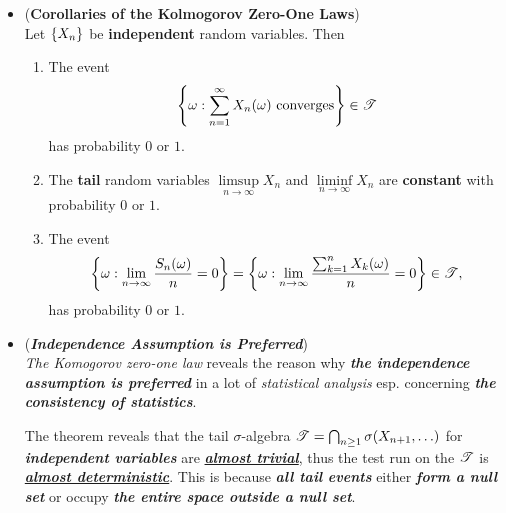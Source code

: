 \documentclass[11pt]{article}
\begin{document}
\begin{itemize}
\item \begin{corollary} (\textbf{Corollaries of the Kolmogorov Zero-One Laws}) \citep{resnick2013probability} \\
Let $\left\{X_{n}\right\}$ be \textbf{independent} random variables. Then 
\begin{enumerate}
\item The event 
\begin{align*}
\left\{\omega: \sum_{n=1}^{\infty}X_{n}(\omega) \text{ converges}\right\} \in {\mathscr T}
\end{align*} has probability $0$ or $1$.
\item The \textbf{tail} random variables $\limsup\limits_{n\rightarrow \infty} X_{n}$ and $\liminf\limits_{n\rightarrow \infty} X_{n}$ are \textbf{constant} with probability $0$ or $1$.
\item The event 
\begin{align*}
\left\{\omega: \lim\limits_{n\rightarrow \infty}\frac{S_n(\omega)}{n} = 0\right\} = \left\{\omega: \lim\limits_{n\rightarrow \infty}\frac{\sum_{k=1}^{n}X_{k}(\omega)}{n} = 0\right\} \in {\mathscr T},
\end{align*} has probability $0$ or $1$.
\end{enumerate}
\end{corollary}

\item \begin{remark} (\emph{\textbf{Independence Assumption is Preferred}})\\
\emph{The Komogorov zero-one law} reveals the reason why \emph{\textbf{the independence assumption is preferred}} in a lot of \emph{statistical analysis} esp. concerning \textit{\textbf{the consistency of statistics}}.


The theorem reveals that the tail $\sigma$-algebra ${\mathscr T} = \bigcap_{n \ge 1}\sigma(X_{n+1}, \ldots)$ for \emph{\textbf{independent variables}} are \underline{\emph{\textbf{almost trivial}}}, thus the test run on the ${\mathscr T}$ is \underline{\emph{\textbf{almost deterministic}}}. This is because \emph{\textbf{all tail events}} either \emph{\textbf{form a null set}} or occupy \emph{\textbf{the entire space outside a null set}}.
\end{remark}
\end{itemize}
\newpage


\end{document}
